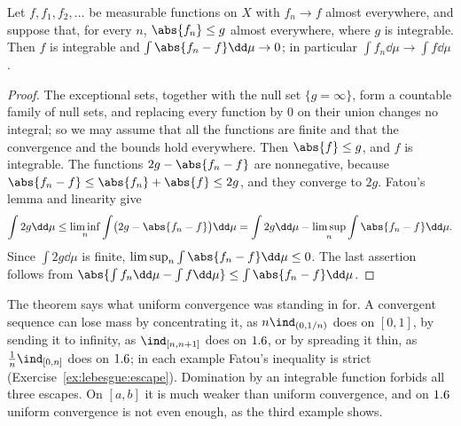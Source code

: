 \begin{refsection}
\begin{theorem}\label{thm:lebesgue:dct}
Let $f,f_1,f_2,\dots$ be measurable functions on $X$ with $f_n\to f$ almost everywhere, and suppose that, for every $n$, $\abs{f_n}\le g$ almost everywhere, where $g$ is integrable. Then $f$ is integrable and $\int\abs{f_n-f}\dd\mu\to0$; in particular $\int f_n\dd\mu\to\int f\dd\mu$.
\end{theorem}

\begin{proof}
The exceptional sets, together with the null set $\{g=\infty\}$, form a countable family of null sets, and replacing every function by $0$ on their union changes no integral; so we may assume that all the functions are finite and that the convergence and the bounds hold everywhere. Then $\abs{f}\le g$, and $f$ is integrable. The functions $2g-\abs{f_n-f}$ are nonnegative, because $\abs{f_n-f}\le\abs{f_n}+\abs{f}\le2g$, and they converge to $2g$. Fatou's lemma and linearity give
\[
  \int2g\dd\mu\le\liminf_n\int\bigl(2g-\abs{f_n-f}\bigr)\dd\mu=\int2g\dd\mu-\limsup_n\int\abs{f_n-f}\dd\mu .
\]
Since $\int2g\dd\mu$ is finite, $\limsup_n\int\abs{f_n-f}\dd\mu\le0$. The last assertion follows from $\abs{\int f_n\dd\mu-\int f\dd\mu}\le\int\abs{f_n-f}\dd\mu$.
\end{proof}

The theorem says what uniform convergence was standing in for. A convergent sequence can lose mass by concentrating it, as $n\ind_{(0,1/n)}$ does on $[0,1]$, by sending it to infinity, as $\ind_{[n,n+1]}$ does on $1.6$, or by spreading it thin, as $\frac1n\ind_{[0,n]}$ does on $1.6$; in each example Fatou's inequality is strict (Exercise~\ref{ex:lebesgue:escape}). Domination by an integrable function forbids all three escapes. On $[a,b]$ it is much weaker than uniform convergence, and on $1.6$ uniform convergence is not even enough, as the third example shows.



\end{refsection}
